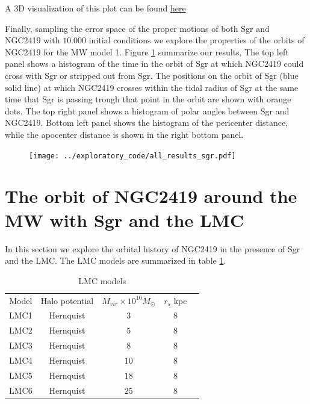 \documentclass[14pt]{article}
\begin{document}
A 3D visualization of this plot can be found \href{https://plot.ly/~jngc/22/orbits/}{here}

Finally, sampling the error space of the proper motions of both Sgr
and NGC2419 with $10.000$ initial conditions we explore the properties
of the orbits of NGC2419 for the MW model 1. Figure \ref{fig:all_sgr}
summarize our results, The top left panel shows a histogram of the
time in the orbit of Sgr at which NGC2419 could cross with Sgr or stripped out from Sgr.
The positions on the orbit of Sgr (blue solid line) at which NGC2419 crosses within 
the tidal radius of Sgr at the same time that Sgr is passing trough 
that point in the orbit are shown with orange dots. The top right
panel shows a histogram of polar angles between Sgr and NGC2419.
Bottom left panel shows the histogram of the pericenter distance,
while the apocenter distance is shown in the right bottom panel.

\begin{figure}[H]
\centering
\texttt{[image: ../exploratory\_code/all\_results\_sgr.pdf]}
\caption{\label{fig:all_sgr}}
\end{figure}


\section{The orbit of NGC2419 around the MW with Sgr and the
LMC}\label{sec:NGCSgrLMC}

In this section we explore the orbital history of NGC2419 
in the presence of Sgr and the LMC. 
The LMC models are summarized in table \ref{tab:LMCmodels}.


\begin{table}[H]
\centering
\begin{tabular}{c c c c c}
\hline
\hline
Model & Halo potential & $M_{vir} \times 10^{10}M_{\odot}$ & $r_s$ kpc  & \\
LMC1 & Hernquist & $3 $ & $8$  \\
LMC2 & Hernquist & $5 $ & $8$  \\
LMC3 & Hernquist & $8 $ & $8$  \\
LMC4 & Hernquist & $10 $ & $8$  \\
LMC5 & Hernquist & $18 $ & $8$  \\
LMC6 & Hernquist & $25 $ & $8$  \\
\hline
\hline
\end{tabular}
\caption{LMC  models\label{tab:LMCmodels}}
\end{table}
\end{document}
